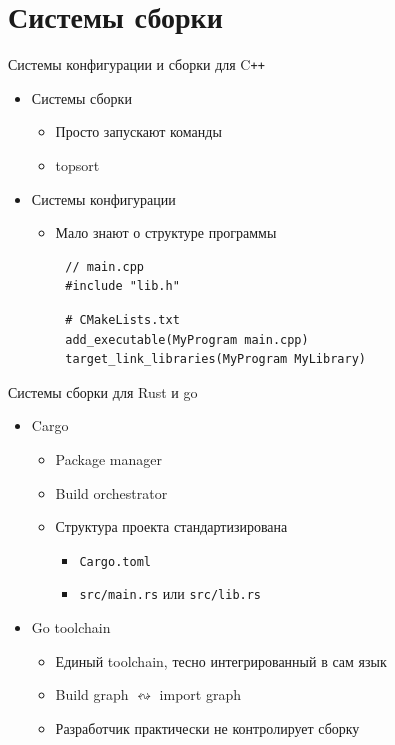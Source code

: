 \documentclass{beamer}
\newcommand\cpp{C\texttt{++}\xspace}
\begin{document}
\section{Системы сборки}

\begin{frame}[fragile]{Системы конфигурации и сборки для \cpp}
    \begin{itemize}
        \item Системы сборки
            \begin{itemize}
                \item Просто запускают команды
                \item topsort
            \end{itemize}
        \item Системы конфигурации
            \begin{itemize}
                \item Мало знают о структуре программы
            \end{itemize}
    \end{itemize}

    \pause
    \begin{verbatim}
        // main.cpp
        #include "lib.h"
    \end{verbatim}
    \begin{verbatim}
        # CMakeLists.txt
        add_executable(MyProgram main.cpp)
        target_link_libraries(MyProgram MyLibrary)
    \end{verbatim}
\end{frame}

\begin{frame}[fragile]{Системы сборки для Rust и go}
    \begin{itemize}
        \item Cargo
            \begin{itemize}
                \item Package manager
                \item Build orchestrator
                \item Структура проекта стандартизирована
                    \begin{itemize}
                        \item \texttt{Cargo.toml}
                        \item \texttt{src/main.rs} или \texttt{src/lib.rs}
                    \end{itemize}
            \end{itemize}
        \item Go toolchain
            \begin{itemize}
                \item Единый toolchain, тесно интегрированный в сам язык
                \item Build graph $ \leftrightsquigarrow $ import graph
                \item Разработчик практически не контролирует сборку
            \end{itemize}
    \end{itemize}
\end{frame}
\end{document}
